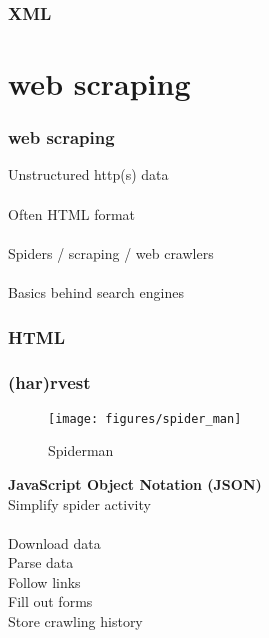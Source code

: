\documentclass{beamer}
\begin{document}
\begin{frame}
	\frametitle{XML}
	\lstXML
\end{frame}

\section{web scraping}

\begin{frame}
	\frametitle{web scraping}
	\begin{center}
		Unstructured http(s) data \\~\\
		
		Often HTML format \\~\\
		
		Spiders / scraping / web crawlers \\~\\
		
		Basics behind search engines
	\end{center}
\end{frame}


\begin{frame}
	\frametitle{HTML}
	\lstHTML
\end{frame}

\begin{frame}
	\frametitle{(har)rvest}
		\begin{wrapfigure}{r}{0.3\textwidth}
			\begin{center}
				\texttt{[image: figures/spider\_man]}
			\end{center}
			\caption{Spiderman}
		\end{wrapfigure}
		\textbf{JavaScript Object Notation (JSON)} \\
		Simplify spider activity \\~\\
		Download data \\
		Parse data \\
		
		Follow links \\
		Fill out forms \\
		Store crawling history
\end{frame}
\end{document}
